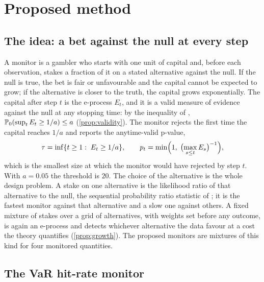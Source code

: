 \section{Proposed method}
\label{sec:proposed-method}

\subsection{The idea: a bet against the null at every step}
\label{sec:method-idea}

A monitor is a gambler who starts with one unit of capital and, before each observation, stakes a fraction of it on a stated alternative against the null. If the null is true, the bet is fair or unfavourable and the
capital cannot be expected to grow; if the alternative is closer to the truth, the capital grows exponentially. The capital after step $t$ is the e-process $E_t$, and it is a valid measure of evidence against the null at any stopping time: by
the inequality of \citet{ville1939}, $\mathbb{P}_0(\sup_t E_t\ge 1/a)\le a$ (\cref{prop:validity}). The monitor rejects the first time the capital reaches $1/a$ and reports the anytime-valid p-value,
\begin{equation}
\tau=\inf\{t\ge1:\;E_t\ge 1/a\},\qquad p_t=\min\Bigl(1,\;\bigl(\max_{s\le t}E_s\bigr)^{-1}\Bigr),
\label{eq:rule}
\end{equation}
which is the smallest size at which the monitor would have rejected by step $t$. With $a=0.05$ the threshold is $20$. The choice of the alternative is the whole design problem. A stake on one
alternative is the likelihood ratio of that alternative to the null, the sequential probability ratio statistic of \citet{wald1945}; it is the fastest monitor against that alternative and a slow
one against others. A fixed mixture of stakes over a grid of alternatives, with weights set before any outcome, is again an e-process and detects whichever alternative the data favour at a cost the theory quantifies
(\cref{prop:growth}). The proposed monitors are mixtures of this kind for four monitored quantities.

\subsection{The VaR hit-rate monitor}
\label{sec:method-rate}

